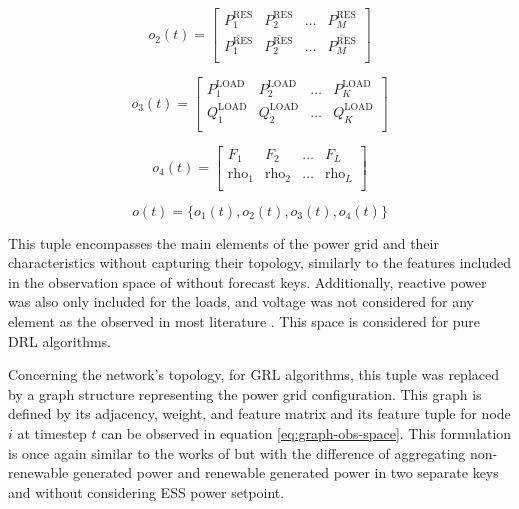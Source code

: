 \begin{description}
	\begin{equation} \label{eq:simple-obs-space2}
		o_{2}(t)= \begin{bmatrix}
			P^\text{RES}_1 & P^\text{RES}_2 & \dots & P^\text{RES}_{M} \\
			\overline{P^\text{RES}_1} & \overline{P^\text{RES}_2} & \dots & \overline{P^\text{RES}_{M}} \\
		\end{bmatrix}
	\end{equation}
	
	\begin{equation} \label{eq:simple-obs-space3}
		o_{3}(t)= \begin{bmatrix}
			P^\text{LOAD}_1 & P^\text{LOAD}_2 & \dots & P^\text{LOAD}_{K} \\
			Q^\text{LOAD}_1 & Q^\text{LOAD}_2 & \dots & Q^\text{LOAD}_{K} \\
		\end{bmatrix}
	\end{equation}
	
	\begin{equation} \label{eq:simple-obs-space4}
		o_{4}(t)= \begin{bmatrix}
			F_1 & F_2 & \dots & F_{L} \\
			\text{rho}_1 & \text{rho}_2 & \dots & \text{rho}_{L} \\
		\end{bmatrix}
	\end{equation}
	
	\begin{equation} \label{eq:simple-obs-space}
		o(t)= \{ o_{1}(t), o_{2}(t), o_{3}(t), o_{4}(t) \}
	\end{equation}
	
	This tuple encompasses the main elements of the power grid and their characteristics without capturing their topology, similarly to the features included in the observation space of \cite{hanAutonomousControlTechnology2023} without forecast keys. Additionally, reactive power was also only included for the loads, and voltage was not considered for any element as the observed in most literature \cite{liNovelGraphReinforcement2022, chenScalableGraphReinforcement2023, liuDistributedEconomicDispatch2018, leiDynamicEnergyDispatch2021, yangDynamicEnergyDispatch2021, xingRealtimeOptimalScheduling2023}. This space is considered for pure \ac{DRL} algorithms. \par 
	Concerning the network's topology, for \ac{GRL} algorithms, this tuple was replaced by a graph structure representing the power grid configuration. This graph is defined by its adjacency, weight, and feature matrix and its feature tuple for node $i$ at timestep $t$ can be observed in equation \ref{eq:graph-obs-space}. This formulation is once again similar to the works of \cite{liNovelGraphReinforcement2022, chenScalableGraphReinforcement2023} but with the difference of aggregating non-renewable generated power and renewable generated power in two separate keys and without considering \ac{ESS} power setpoint.
	

\end{description}
